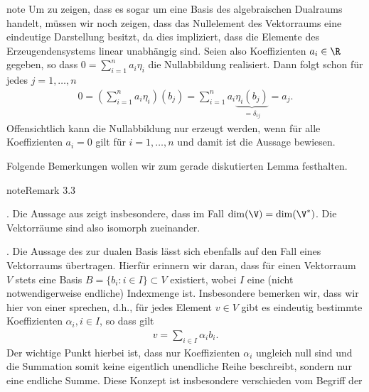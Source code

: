 \documentclass[letterpaper,10pt,german]{jupyterBook}
\begin{document}
\begin{sphinxadmonition}{note}
\sphinxAtStartPar
Um zu zeigen, dass es sogar um eine Basis des algebraischen Dualraums handelt, müssen wir noch zeigen, dass das Nullelement des Vektorraums eine eindeutige Darstellung besitzt, da dies impliziert, dass die Elemente des Erzeugendensystems linear unabhängig sind.
Seien also Koeffizienten \(a_i\in\R\) gegeben, so dass \(0 = \sum_{i=1}^n a_i \eta_i\) die Nullabbildung realisiert.
Dann folgt schon für jedes \(j=1,\ldots,n\)
\begin{equation*}
\begin{split}0 = \left(\sum_{i=1}^n a_i \eta_i\right)(b_j) = \sum_{i=1}^n a_i \underbrace{\eta_i(b_j)}_{=\delta_{ij}} = a_j.\end{split}
\end{equation*}
\sphinxAtStartPar
Offensichtlich kann die Nullabbildung nur erzeugt werden, wenn für alle Koeffizienten \(a_i=0\) gilt für \(i=1,\ldots,n\) und damit ist die Aussage bewiesen.
\end{sphinxadmonition}

\sphinxAtStartPar
Folgende Bemerkungen wollen wir zum gerade diskutierten Lemma festhalten.
\label{vektoranalysis/multilinear:remark-11}
\begin{sphinxadmonition}{note}{Remark 3.3}



. Die Aussage aus {\hyperref[\detokenize{vektoranalysis/multilinear:lem:dualeBasis}]{}} zeigt insbesondere, dass im  Fall \(\dim(\V) = \dim(\V^\ast)\).
Die Vektorräume sind also isomorph zueinander.

. Die Aussage des {\hyperref[\detokenize{vektoranalysis/multilinear:lem:dualeBasis}]{}} zur dualen Basis lässt sich ebenfalls auf den Fall eines  Vektorraums übertragen.
Hierfür erinnern wir daran, dass für einen Vektorraum \(V\) stets eine Basis \(B = \{b_i:i\in I\}\subset V\) existiert, wobei \(I\) eine (nicht notwendigerweise endliche) Indexmenge ist.
Insbesondere bemerken wir, dass wir hier von einer  sprechen, d.h., für jedes Element \(v\in V\) gibt es eindeutig bestimmte Koeffizienten \(\alpha_i, i\in I\), so dass gilt
\begin{equation*}
\begin{split}v = \sum_{i\in I} \alpha_i b_i.\end{split}
\end{equation*}
\sphinxAtStartPar
Der wichtige Punkt hierbei ist, dass nur  Koeffizienten \(\alpha_i\) ungleich null sind und die Summation somit keine eigentlich unendliche Reihe beschreibt, sondern nur eine endliche Summe.
Diese Konzept ist insbesondere verschieden vom Begriff der 
\end{sphinxadmonition}
\end{document}
